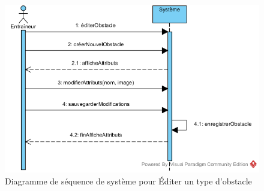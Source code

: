 \begin{figure}[htpb]
    \centering
    \includegraphics[scale=0.5]{fig/ssd_editer_obstacle.png}
    \caption{Diagramme de séquence de système pour Éditer un type d'obstacle}
    \label{fig:ssd_editer_obstacle}
\end{figure}



